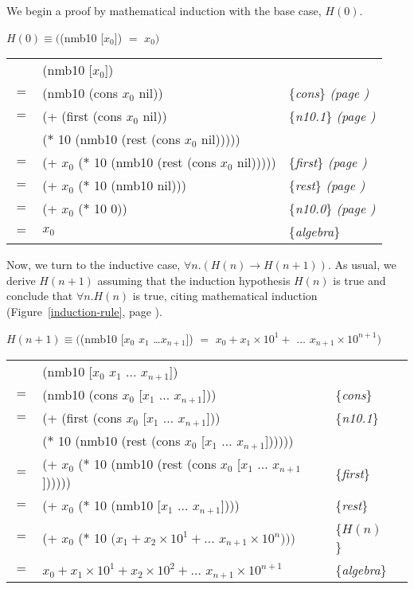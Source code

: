 We begin a proof by mathematical induction with the base case, $H(0)$.
\begin{center}
$H(0) \equiv ($\textsf{(nmb10 [$x_0$])} $=$ $x_0)$ \\
\begin{tabular}{rll}
\hline
    & \textsf{(nmb10 [$x_0$])}           & \\
$=$ & \textsf{(nmb10 (cons $x_0$ nil))}  & \{\emph{cons}\} \emph{(page \pageref{first-rest-cons})} \\
$=$ & \textsf{(+ (first (cons $x_0$ nil))}  & \{\emph{n10.1}\} \emph{(page \pageref{nmb10-defun})} \\
    & \phantom{\textsf{(+ }}\textsf{($*$ 10 (nmb10 (rest (cons $x_0$ nil)))))} &\\
$=$ & \textsf{(+ $x_0$ ($*$ 10 (nmb10 (rest (cons $x_0$ nil)))))}  & \{\emph{first}\} \emph{(page \pageref{first-rest-cons})} \\
$=$ & \textsf{(+ $x_0$ ($*$ 10 (nmb10 nil)))}  & \{\emph{rest}\} \emph{(page \pageref{first-rest-cons})} \\
$=$ & \textsf{(+ $x_0$ ($*$ 10 0))}  & \{\emph{n10.0}\} \emph{(page \pageref{nmb10-defun})} \\
$=$ & $x_0$  & \{\emph{algebra}\} \\
\end{tabular}
\end{center}

Now, we turn to the inductive case, $\forall n. (H(n) \rightarrow H(n+1))$.
As usual, we derive $H(n+1)$ assuming that the induction hypothesis $H(n)$ is true
and conclude that $\forall n.H(n)$ is true,
citing mathematical induction
(Figure~\ref{induction-rule}, page \pageref{induction-rule}).

\begin{center}
$H(n+1) \equiv ($\textsf{(nmb10 [$x_0$ $x_1$ \dots $x_{n+1}$])} $=$
$x_0 + x_1 \times 10^1 +$  $\dots$ $x_{n+1} \times 10^{n+1})$ \\
\begin{tabular}{rlll}
\hline
    & \textsf{(nmb10 [$x_0$ $x_1$ $\dots$ $x_{n+1}$])}           & &\\
$=$ & \textsf{(nmb10 (cons $x_0$ [$x_1$ $\dots$ $x_{n+1}$]))}    & \{\emph{cons}\}&\\
$=$ & \textsf{(+ (first (cons $x_0$ [$x_1$ $\dots$ $x_{n+1}$]))}  & \{\emph{n10.1}\} &\\
    & \phantom{\textsf{(+ }}\textsf{($*$ 10 (nmb10 (rest (cons $x_0$ [$x_1$ $\dots$ $x_{n+1}$])))))} &&\\
$=$ & \textsf{(+ $x_0$ ($*$ 10 (nmb10 (rest (cons $x_0$ [$x_1$ $\dots$ $x_{n+1}$])))))}      & \{\emph{first}\} &\\
$=$ & \textsf{(+ $x_0$ ($*$ 10 (nmb10 [$x_1$ $\dots$ $x_{n+1}$])))}                          & \{\emph{rest}\}&\\
$=$ & \textsf{(+ $x_0$ ($*$ 10 $(x_1 + x_2 \times 10^1 + \dots$ $x_{n+1} \times 10^{n})))$}  & \{$H(n)$\}&\\
$=$ & $x_0 + x_1 \times 10^1 + x_2 \times 10^2 + \dots$ $x_{n+1} \times 10^{n+1}$   & \{\emph{algebra}\} &\\
\end{tabular}
\end{center}

